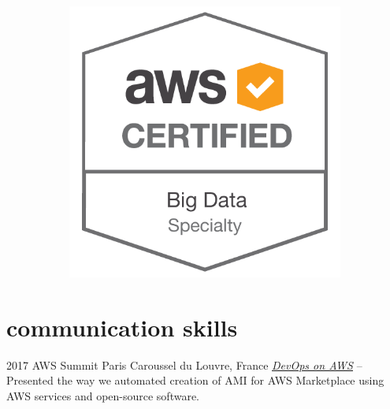 \documentclass[print]{cv-a4}
\begin{document}
\begin{figure}[h!]
\begin{subfigure}[b]{0.2\linewidth}
  \end{subfigure}
  \begin{subfigure}[b]{0.2\linewidth}
    \includegraphics[width=\linewidth]{images/BDS.png}
  \end{subfigure}
\end{figure}



\section{communication skills}

\begin{entrylist}


\entry
{2017}
{AWS Summit Paris}
{Caroussel du Louvre, France}
{\emph{\href{https://youtu.be/54cwFTMPxOo}{DevOps on AWS} } -- Presented the way we automated creation of AMI for AWS Marketplace using AWS services and open-source software.}


\end{entrylist}
\end{document}
